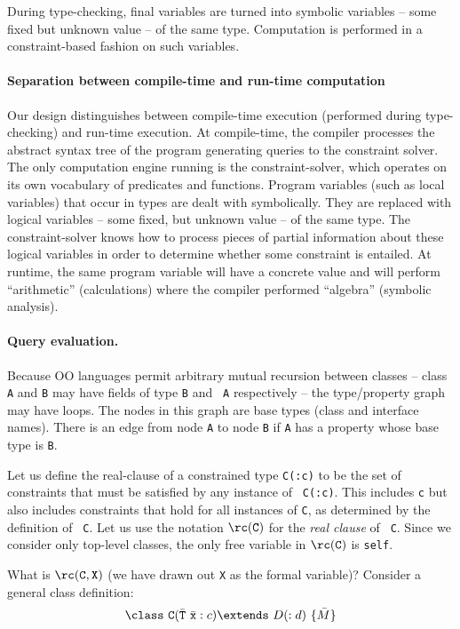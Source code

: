 During type-checking, final variables are turned into symbolic
variables -- some fixed but unknown value -- of the same type.
Computation is performed in a constraint-based fashion on such
variables.

\paragraph{Separation between compile-time and run-time computation}
Our design distinguishes between compile-time execution (performed
during type-checking) and run-time execution. At compile-time, the
compiler processes the abstract syntax tree of the program generating
queries to the constraint solver. The only computation engine running
is the constraint-solver, which operates on its own vocabulary of
predicates and functions. Program variables (such as local variables)
that occur in types are dealt with symbolically. They are replaced
with logical variables -- some fixed, but unknown value -- of the same
type. The constraint-solver knows how to process pieces of partial
information about these logical variables in order to determine
whether some constraint is entailed. At runtime, the same program
variable will have a concrete value and will perform ``arithmetic''
(calculations) where the compiler performed ``algebra'' (symbolic
analysis).

\paragraph{Query evaluation.}

Because OO languages permit arbitrary mutual recursion between classes
-- class {\tt A} and {\tt B} may have fields of type {\tt B} and {\tt
A} respectively -- the type/property graph may have loops. The nodes
in this graph are base types (class and interface names). There is an
edge from node {\tt A} to node {\tt B} if {\tt A} has a property whose
base type is {\tt B}.

Let us define the real-clause of a constrained type {\tt C(:c)} to be
the set of constraints that must be satisfied by any instance of {\tt
C(:c)}. This includes {\tt c} but also includes constraints that hold
for all instances of {\tt C}, as determined by the definition of {\tt
C}. Let us use the notation $\rc({\tt C})$ for the {\em real clause} of {\tt
C}. Since we consider only top-level classes, the only free variable in 
$\rc({\tt C})$ is {\tt self}.

What is $\rc({\tt C}, {\tt X})$ (we have drawn out {\tt X} as the
formal variable)? Consider a general class definition:
$$\class\ {\tt C}(\bar{\tt T}\ \bar{\tt x} : c)\extends\ D(:d)\ \{\bar{M}\}$$

